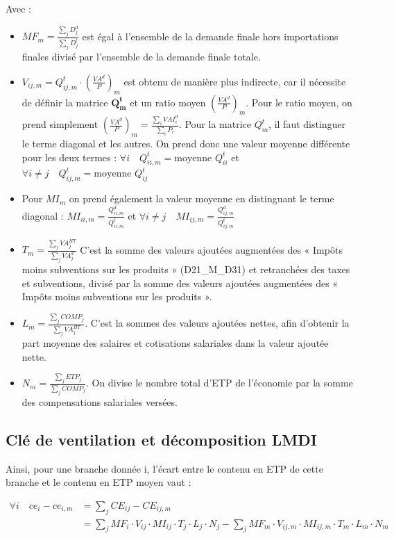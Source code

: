Avec :
\begin{itemize}
	\item $MF_m = \frac{\sum_j D^d_j}{\sum_j D^t_j} $  est égal à l’ensemble de la demande finale hors importations finales divisé par l’ensemble de la demande finale totale.
	\item $V_{ij,m} = Q^t_{ij,m} \cdot (\frac{VA^d}{P})_m$ est obtenu de manière plus indirecte, car il nécessite de définir la matrice $\pmb{Q^t_m}$ et un ratio moyen $(\frac{VA^d}{P})_m$. Pour le ratio moyen, on prend simplement $(\frac{VA^d}{P})_m = \frac{\sum_i VAI^d_i}{\sum_i P_i}$.
	Pour la matrice $Q^t_m$, il faut distinguer le terme diagonal et les autres. On prend donc une valeur moyenne différente pour les deux termes : $\forall i \quad Q^t_{ii,m} = \text{moyenne } {Q^t_{ii}}$ et $\forall i \neq j \quad Q^t_{ij,m} = \text{moyenne }{Q^t_{ij}}$
	\item Pour $MI_m$ on prend également la valeur moyenne en distinguant le terme diagonal : $MI_{ii,m} = \frac{Q^d_{ii,m}}{Q^t_{ii,m}}$ et $\forall i \neq j \quad MI_{ij,m} = \frac{Q^d_{ij,m}}{Q^t_{ij,m}}$
	\item $T_m = \frac{\sum_j VA^{HT}_j}{\sum_j VA^d_j}$ C’est la somme des valeurs ajoutées augmentées des « Impôts moins subventions sur les produits » (D21\_M\_D31) et retranchées des taxes et subventions, divisé par la somme des valeurs ajoutées augmentées des « Impôts moins subventions sur les produits ».
	\item $L_m = \frac{\sum_j COMP_j}{\sum_j VA^{HT}_j}$. C'est la sommes des valeurs ajoutées nettes, afin d’obtenir la part moyenne des salaires et cotisations salariales dans la valeur ajoutée nette.
	\item $N_m = \frac{\sum_j ETP_j}{\sum_j COMP_j}$. On divise le nombre total d’ETP de l’économie par la somme des compensations salariales versées.
\end{itemize}
 
 
\clearpage

\subsection{Clé de ventilation et décomposition LMDI}
\label{app:ventilation_LMDI}

Ainsi, pour une branche donnée i, l’écart entre le contenu en ETP de cette branche et le contenu en ETP moyen vaut :

\begin{align}
\forall i \quad ce_i - ce_{i,m} &= \sum_j CE_{ij} - CE_{ij,m} \\
											&= \sum_j MF_i \cdot V_{ij} \cdot MI_{ij} \cdot T_j \cdot L_j \cdot N_j -  \sum_j MF_m \cdot V_{ij,m} \cdot MI_{ij,m} \cdot T_m \cdot L_m \cdot N_m 
\label{diff_ce}
\end{align}

